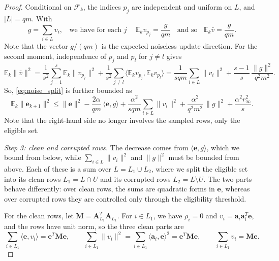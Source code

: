 \documentclass[pdflatex,sn-mathphys-num]{sn-jnl}
\theoremstyle{thmstyleone}
\theoremstyle{thmstylethree}
\newcommand{\proofstep}[1]{\par\medskip\noindent\emph{#1}}
\newcommand{\mA}{\mathbf{A}}
\newcommand{\va}{\mathbf{a}}
\newcommand{\ve}{\mathbf{e}}
\begin{document}
\begin{proof}
Conditional on $\mathcal F_k$, the indices $p_j$ are
independent and uniform on $L$, and $|L|=qm$. With \[g=\sum_{i\in L}v_i, 
\;\; \text{ we have for each $j$ } \;\; \mathbb E_kv_{p_j}=\frac{g}{qm} \;\; \text{ and so }  \;\; \mathbb E_k \bar v = \frac{g}{qm}.\]
Note that the vector
$g/(qm)$ is the expected noiseless update direction. For
the second moment, independence of $p_j$ and $p_l$ for $j\ne l$ gives
\[
\mathbb E_k\|\bar v\|^2
=\frac1{s^2}\sum_{j=1}^s\mathbb E_k\|v_{p_j}\|^2
+\frac1{s^2}\sum_{j\ne l}\bigl\langle\mathbb E_kv_{p_j},
\mathbb E_kv_{p_l}\bigr\rangle
= \frac{1}{sqm}\sum_{i\in L}\|v_i\|^2+\frac{s-1}{s}\,\frac{\|g\|^2}{q^2m^2}.
\]
So, \eqref{eq:noise_split} is further bounded as
\begin{equation}
\label{eq:three_sums}
\mathbb E_k\|\ve_{k+1}\|^2
\le\|\ve\|^2-\frac{2\alpha}{qm}\,\langle\ve,g\rangle
+\frac{\alpha^2}{sqm}\sum_{i\in L}\|v_i\|^2
+\frac{\alpha^2}{q^2m^2}\,\|g\|^2+\frac{\alpha^2r_\infty^2}{s}.
\end{equation}
Note that the right-hand side no longer involves the sampled rows, only the eligible
set.

\proofstep{Step 3: clean and corrupted rows.} The decrease comes
from $\langle\ve,g\rangle$, which we bound from below, while
$\sum_{i\in L}\|v_i\|^2$ and $\|g\|^2$ must be bounded from above. Each of
these is a sum over $L=L_1\cup L_2$, where we split the eligible
set into its clean rows $L_1=L\cap U$ and its corrupted rows
$L_2=L\setminus U$. The two parts behave differently:
over clean rows, the sums are quadratic forms in $\ve$, whereas over corrupted
rows they are controlled only through the eligibility threshold.

For the clean rows, let $\mathbf M=\mA_{L_1}^T\mA_{L_1}$. For $i\in L_1$, we
have $\rho_i=0$ and $v_i=\va_i\va_i^T\ve$, and the rows have unit norm, so
the three clean parts are
\[
\sum_{i\in L_1}\langle\ve,v_i\rangle=\ve^T\mathbf M\ve,
\qquad
\sum_{i\in L_1}\|v_i\|^2=\sum_{i\in L_1}\langle\va_i,\ve\rangle^2
=\ve^T\mathbf M\ve,
\qquad
\sum_{i\in L_1}v_i=\mathbf M\ve .
\]


\end{proof}
\end{document}
